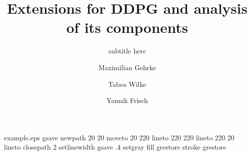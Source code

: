 %
%
%
%
%
\begin{filecontents*}{example.eps}
gsave
newpath
  20 20 moveto
  20 220 lineto
  220 220 lineto
  220 20 lineto
closepath
2 setlinewidth
gsave
  .4 setgray fill
grestore
stroke
grestore
\end{filecontents*}
%
\RequirePackage{fix-cm}
%
\documentclass[smallextended]{svjour3}       %
%
\smartqed  %
%
\usepackage{graphicx}
%
%
%
%
%


\title{Extensions for DDPG and analysis of its components
}
\subtitle{subtitle here}


\author{Maximilian Gehrke \and Tabea Wilke \and Yannik Frisch %
}



